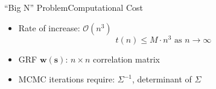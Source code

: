 \documentclass{beamer}
\begin{document}
\begin{frame}{``Big N'' Problem}{Computational Cost}
\begin{itemize}
\addtolength{\itemsep}{0.5\baselineskip}
\item Rate of increase: $\mathcal{O}(n^{3})$
$$t(n) \leq M \cdot n^{3} \text{ as } n \rightarrow \infty$$
\item GRF $\pmb{w}(\pmb{s})$: $n \times n$ correlation matrix
\item MCMC iterations require: $\Sigma^{-1}$, determinant of $\Sigma$
\end{itemize}
\end{frame}
% 
% 
% 
% 
\end{document}
